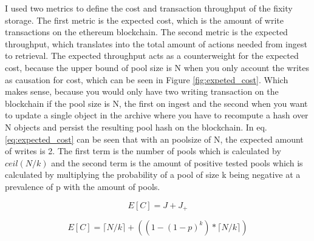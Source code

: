 I used two metrics to define the cost and transaction throughput of the fixity storage. The first metric is the expected cost, which is the amount of write transactions on the ethereum blockchain. The second metric is the expected throughput, which translates into the total amount of actions needed from ingest to retrieval. The expected throughput acts as a counterweight for the expected cost, because the upper bound of pool size is N when you only account the writes as causation for cost, which can be seen in Figure \ref{fig:expeted_cost}. Which makes sense, because you would only have two writing transaction on the blockchain if the pool size is N, the first on ingest and the second when you want to update a single object in the archive where you have to recompute a hash over N objects and persist the resulting pool hash on the blockchain. In eq. \ref{eq:expected_cost} can be seen that with an poolsize of N, the expected amount of writes is 2. The first term is the number of pools which is calculated by $ceil(N/k)$ and the second term is the amount of positive tested pools which is calculated by multiplying the probability of a pool of size k being negative at a prevalence of p with the amount of pools.

\begin{equation}\label{eq:expected_cost}
    E[C] = J + J_+
\end{equation}


\begin{equation}
    E[C] = \lceil N/k \rceil + ((1 - (1-p)^k) * \lceil N/k \rceil)
\end{equation}


